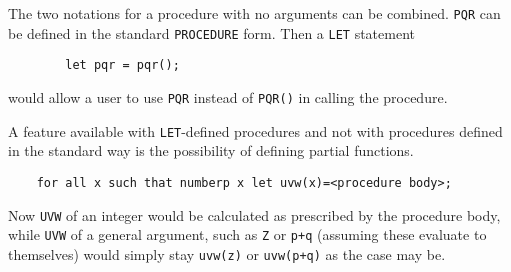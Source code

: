 The two notations for a procedure with no arguments can be combined. {\tt PQR}
can be defined in the standard {\tt PROCEDURE} form. Then a {\tt LET}
statement
\begin{verbatim}
        let pqr = pqr();
\end{verbatim}
would allow a user to use {\tt PQR} instead of {\tt PQR()} in calling the
procedure.

A feature available with {\tt LET}-defined procedures and not with procedures
defined in the standard way is the possibility of defining partial
functions.
\begin{verbatim}
    for all x such that numberp x let uvw(x)=<procedure body>;
\end{verbatim}
Now {\tt UVW} of an integer would be calculated as prescribed by the procedure
body, while {\tt UVW} of a general argument, such as {\tt Z} or {\tt p+q}
(assuming these evaluate to themselves) would simply stay {\tt uvw(z)}
or {\tt uvw(p+q)} as the case may be.

